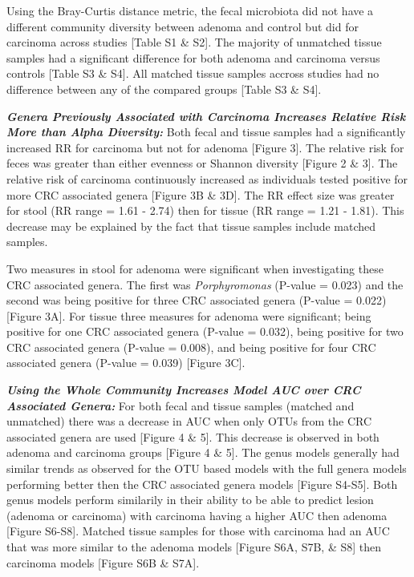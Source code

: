 \documentclass[12pt,]{article}
\begin{document}
Using the Bray-Curtis distance metric, the fecal microbiota did not have
a different community diversity between adenoma and control but did for
carcinoma across studies {[}Table S1 \& S2{]}. The majority of unmatched
tissue samples had a significant difference for both adenoma and
carcinoma versus controls {[}Table S3 \& S4{]}. All matched tissue
samples accross studies had no difference between any of the compared
groups {[}Table S3 \& S4{]}.

\textbf{\emph{Genera Previously Associated with Carcinoma Increases
Relative Risk More than Alpha Diversity:}} Both fecal and tissue samples
had a significantly increased RR for carcinoma but not for adenoma
{[}Figure 3{]}. The relative risk for feces was greater than either
evenness or Shannon diversity {[}Figure 2 \& 3{]}. The relative risk of
carcinoma continuously increased as individuals tested positive for more
CRC associated genera {[}Figure 3B \& 3D{]}. The RR effect size was
greater for stool (RR range = 1.61 - 2.74) then for tissue (RR range =
1.21 - 1.81). This decrease may be explained by the fact that tissue
samples include matched samples.

Two measures in stool for adenoma were significant when investigating
these CRC associated genera. The first was \emph{Porphyromonas} (P-value
= 0.023) and the second was being positive for three CRC associated
genera (P-value = 0.022) {[}Figure 3A{]}. For tissue three measures for
adenoma were significant; being positive for one CRC associated genera
(P-value = 0.032), being positive for two CRC associated genera (P-value
= 0.008), and being positive for four CRC associated genera (P-value =
0.039) {[}Figure 3C{]}.

\textbf{\emph{Using the Whole Community Increases Model AUC over CRC
Associated Genera:}} For both fecal and tissue samples (matched and
unmatched) there was a decrease in AUC when only OTUs from the CRC
associated genera are used {[}Figure 4 \& 5{]}. This decrease is
observed in both adenoma and carcinoma groups {[}Figure 4 \& 5{]}. The
genus models generally had similar trends as observed for the OTU based
models with the full genera models performing better then the CRC
associated genera models {[}Figure S4-S5{]}. Both genus models perform
similarily in their ability to be able to predict lesion (adenoma or
carcinoma) with carcinoma having a higher AUC then adenoma {[}Figure
S6-S8{]}. Matched tissue samples for those with carcinoma had an AUC
that was more similar to the adenoma models {[}Figure S6A, S7B, \& S8{]}
then carcinoma models {[}Figure S6B \& S7A{]}.
\end{document}
